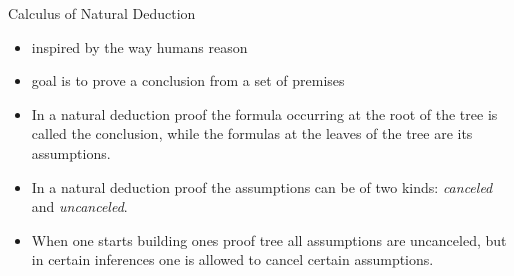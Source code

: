 \documentclass{beamer}
\begin{document}
  \begin{frame}{Calculus of Natural Deduction}
    \begin{itemize}
      \item inspired by the way humans reason
      \item goal is to prove a conclusion from a set of premises
      \item In a natural deduction proof the formula occurring at the root of the tree is called the conclusion, while the formulas at the leaves of the tree are its assumptions.
      \item In a natural deduction proof the assumptions can be of two kinds: \textit{canceled} and \textit{uncanceled}.
      \item When one starts building ones proof tree all assumptions are uncanceled, but in certain inferences one is allowed to cancel certain assumptions.
  
    \end{itemize}
    
  \end{frame}
\end{document}

